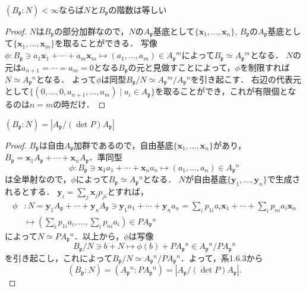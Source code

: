 \begin{screen}
  $(B_\mathfrak{p}:N)<\infty$ならば$N$と$B_\mathfrak{p}$の階数は等しい
\end{screen}
\begin{proof}
  $N$は$B_\mathfrak{p}$の部分加群なので，$N$の$A_\mathfrak{p}$基底として$\{\boldsymbol{x}_1, \ldots, \boldsymbol{x}_n\}$, $B_\mathfrak{p}$の$A_\mathfrak{p}$基底として$\{\boldsymbol{x}_1, \ldots, \boldsymbol{x}_m\}$を取ることができる．
  写像$\phi\colon B_\mathfrak{p}\ni a_1\boldsymbol{x}_1 + \cdots + a_m\boldsymbol{x}_m\mapsto(a_1, \ldots, a_m)\in A_\mathfrak{p}{}^m$によって$B_\mathfrak{p}\simeq A_\mathfrak{p}{}^m$となる．
  $N$の元は$a_{n + 1} = \cdots = a_m = 0$となる$B_\mathfrak{p}$の元と見做すことによって，$\phi$を制限すれば$N\simeq A_\mathfrak{p}{}^n$となる．
  よって$\phi$は同型$B_\mathfrak{p}/N\simeq A_\mathfrak{p}{}^m/A_\mathfrak{p}{}^n$を引き起こす．
  右辺の代表元として$\{(0, \ldots, 0, a_{n + 1}, \ldots, a_m)\mid a_i\in A_\mathfrak{p}\}$を取ることができ，これが有限個となるのは$n = m$の時だけ．
\end{proof}

\begin{screen}
  $(B_\mathfrak{p}:N) = |A_\mathfrak{p}/(\det P)A_\mathfrak{p}|$
\end{screen}
\begin{proof}
  $B_\mathfrak{p}$は自由$A_\mathfrak{p}$加群であるので，自由基底$\{\boldsymbol{x}_1, \ldots, \boldsymbol{x}_n\}$があり，$B_\mathfrak{p} = \boldsymbol{x}_1A_\mathfrak{p} + \cdots + \boldsymbol{x}_nA_\mathfrak{p}$．準同型
  \[\phi\colon B_\mathfrak{p}\ni\boldsymbol{x}_1a_1 + \cdots + \boldsymbol{x}_na_n\mapsto (a_1, \ldots, a_n)\in A_\mathfrak{p}{}^n\]
  は全単射なので，$\phi$によって$B_\mathfrak{p}\simeq A_\mathfrak{p}{}^n$となる．
  $N$が自由基底$\{\boldsymbol{y}_1, \ldots, \boldsymbol{y}_n\}$で生成されるとする．
  $\boldsymbol{y}_i = \sum_{j}\boldsymbol{x}_jp_{ji}$とすれば，
  \begin{align*}
    \phi & \colon N = \boldsymbol{y}_1A_\mathfrak{p} + \cdots + \boldsymbol{y}_nA_\mathfrak{p}\ni\boldsymbol{y}_1a_1 + \cdots + \boldsymbol{y}_na_n = \sum_ip_{1i}a_i\boldsymbol{x}_1 + \cdots + \sum_ip_{ni}a_i\boldsymbol{x}_n \\
    & \mapsto \left(\sum_ip_{1i}a_i, \ldots, \sum_ip_{ni}a_i\right)\in PA_\mathfrak{p}{}^n
  \end{align*}
  によって$N\simeq PA_\mathfrak{p}{}^n$．以上から，$\phi$は写像
  \[B_\mathfrak{p}/N\ni b + N\mapsto \phi(b) + PA_\mathfrak{p}{}^n\in A_\mathfrak{p}{}^n/PA_\mathfrak{p}{}^n\]
  を引き起こし，これによって$B_\mathfrak{p}/N\simeq A_\mathfrak{p}{}^n/PA_\mathfrak{p}{}^n$．よって，系1.6.3から
  \[(B_\mathfrak{p}:N) = (A_\mathfrak{p}{}^n:PA_\mathfrak{p}{}^n) = |A_\mathfrak{p}{}/(\det P)A_\mathfrak{p}|.\]
\end{proof}

